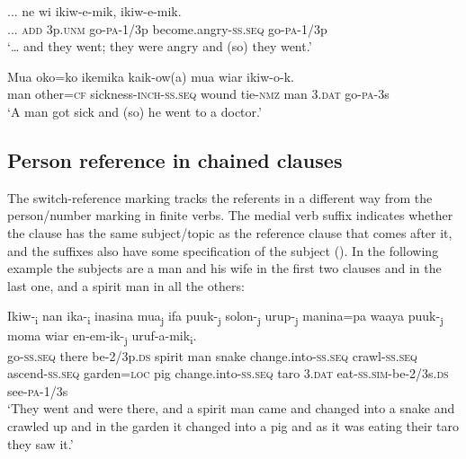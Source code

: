 \ea%
\label{ex:8:x1441}
\gll ...  ne  wi  ikiw-e-mik,    ikiw-e-mik. \\
...  \textsc{add} 3p.\textsc{unm} go-\textsc{pa}-1/3p become.angry-\textsc{ss}.\textsc{seq} go-\textsc{pa}-1/3p\\
\glt`{\dots} and they went; they were angry and (so) they went.'
\z


\ea%
\label{ex:8:x1484}
\gll Mua  oko=ko    ikemika  kaik-ow(a)  mua wiar  ikiw-o-k.\\
man  other=\textsc{cf} sickness-\textsc{inch}-\textsc{ss}.\textsc{seq} wound tie-\textsc{nmz} man 3.\textsc{dat} go-\textsc{pa}-3s\\
\glt`A man got sick and (so) he went to a doctor.'
\z


\subsection{Person reference in chained clauses} \label{sec:8.2.3}

The switch-reference marking tracks the referents in a different way from the person/number marking in finite verbs. The medial verb suffix indicates whether the clause has the same subject/topic as the reference clause that comes after it, and the  suffixes also have some specification of the subject (). In the following example the subjects are a man and his wife in the first two clauses and in the last one, and a spirit man in all the others:

\ea%
\label{ex:8:x1436}
\gll Ikiw-\textsubscript{i}  nan  ika-\textsubscript{i}  inasina  mua\textsubscript{j}  ifa  puuk-\textsubscript{j}  solon-\textsubscript{j}  urup-\textsubscript{j}  manina=pa  waaya puuk-\textsubscript{j}  moma  wiar  en-em-ik-\textsubscript{j} uruf-a-mik\textsubscript{i}.\\
go-\textsc{ss}.\textsc{seq} there be-2/3p.\textsc{ds} spirit  man  snake change.into-\textsc{ss}.\textsc{seq} crawl-\textsc{ss}.\textsc{seq} ascend-\textsc{ss}.\textsc{seq} garden=\textsc{loc} pig change.into-\textsc{ss}.\textsc{seq} taro 3.\textsc{dat} eat-\textsc{ss}.\textsc{sim}-be-2/3s.\textsc{ds} see-\textsc{pa}-1/3s\\
\glt`They went and were there, and a spirit man came and changed into a snake and crawled up and in the garden it changed into a pig and as it was eating their taro they saw it.'
\z


